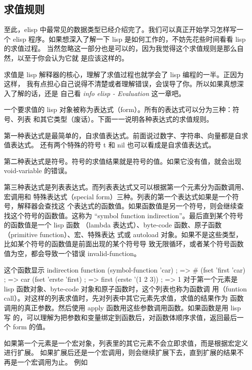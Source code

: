 \documentclass[11pt]{ctexart}
\begin{document}
\subsection{求值规则}
\label{sec:orgd8b3cf7}
至此，elisp 中最常见的数据类型已经介绍完了。我们可以真正开始学习怎样写一个 elisp
程序。如果想深入了解一下 lisp 是如何工作的，不妨先花些时间看看 lisp 的求值过程。
当然忽略这一部分也是可以的，因为我觉得这个求值规则是那么自然，以至于你会认为它就
是应该这样的。

求值是 lisp 解释器的核心，理解了求值过程也就学会了 lisp 编程的一半。正因为这样，
我有点担心自己说得不清楚或者理解错误，会误导了你。所以如果真想深入了解的话，还是
自己看 \emph{info elisp - Evaluation} 这一章吧。

一个要求值的 lisp 对象被称为表达式（form）。所有的表达式可以分为三种：符号、列表
和其它类型（废话）。下面一一说明各种表达式的求值规则。

第一种表达式是最简单的，自求值表达式。前面说过数字、字符串、向量都是自求值表达式。
还有两个特殊的符号 t 和 nil 也可以看成是自求值表达式。

第二种表达式是符号。符号的求值结果就是符号的值。如果它没有值，就会出现
void-variable 的错误。

第三种表达式是列表表达式。而列表表达式又可以根据第一个元素分为函数调用、宏调用和
特殊表达式（special form）三种。列表的第一个表达式如果是一个符号，解释器会查找这
个表达式的函数值。如果函数值是另一个符号，则会继续查找这个符号的函数值。这称为
“symbol function indirection”。最后直到某个符号的函数值是一个 lisp 函数
（lambda 表达式）、byte-code 函数、原子函数（primitive function）、宏、特殊表达
式或 autoload 对象。如果不是这些类型，比如某个符号的函数值是前面出现的某个符号导
致无限循环，或者某个符号函数值为空，都会导致一个错误 invalid-function。

这个函数显示 indirection function
(symbol-function 'car)                  ; => \#<subr car>
(fset 'first 'car)                      ; => car
(fset 'erste 'first)                    ; => first
(erste '(1 2 3))                        ; => 1
对于第一个元素是 lisp 函数对象、byte-code 对象和原子函数时，这个列表也称为函数调
用（funtion call）。对这样的列表求值时，先对列表中其它元素先求值，求值的结果作为
函数调用的真正参数。然后使用 apply 函数用这些参数调用函数。如果函数是用 lisp 写
的，可以理解为把参数和变量绑定到函数后，对函数体顺序求值，返回最后一个 form 的值。

如果第一个元素是一个宏对象，列表里的其它元素不会立即求值，而是根据宏定义进行扩展。
如果扩展后还是一个宏调用，则会继续扩展下去，直到扩展的结果不再是一个宏调用为止。
例如
\end{document}
